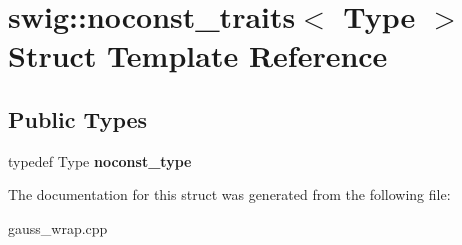 \hypertarget{structswig_1_1noconst__traits}{\section{swig\-:\-:noconst\-\_\-traits$<$ Type $>$ Struct Template Reference}
\label{structswig_1_1noconst__traits}
}
\subsection*{Public Types}
\begin{DoxyCompactItemize}
\item 
\hypertarget{structswig_1_1noconst__traits_a372428d7bd7dc7ea86f03714159d6354}{typedef Type {\bfseries noconst\-\_\-type}}\label{structswig_1_1noconst__traits_a372428d7bd7dc7ea86f03714159d6354}

\end{DoxyCompactItemize}


The documentation for this struct was generated from the following file\-:\begin{DoxyCompactItemize}
\item 
gauss\-\_\-wrap.\-cpp\end{DoxyCompactItemize}

